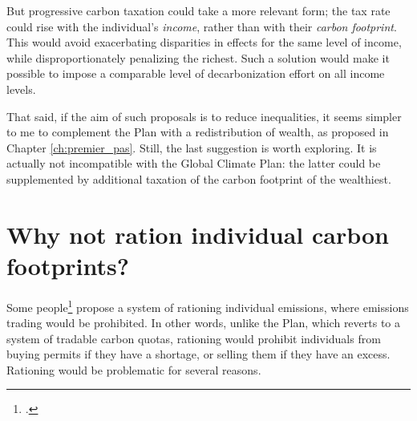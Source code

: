 \documentclass[a5paper,english,openany]{memoir}
\begin{document}
But progressive carbon taxation could take a more relevant form; %
the tax rate could rise with the individual's \textit{income}, rather than with their  %
\textit{carbon footprint}. This would avoid exacerbating disparities in effects for the same level of income, while disproportionately penalizing the richest. Such a solution would make it possible to impose a comparable level of decarbonization effort on all income levels. 


That said, if the aim of such proposals is to reduce inequalities, it seems simpler to me to complement the Plan with a redistribution of wealth, as proposed in Chapter \ref{ch:premier_pas}. Still, the last suggestion is worth exploring. It is actually not incompatible with the Global Climate Plan: the latter could be supplemented by additional taxation of the carbon footprint of the wealthiest. 

\section*{\normalsize Why not ration individual carbon footprints?}\label{q:rationing}

Some people\footnote{\citet{wood_rationing_2023}.} propose a system of rationing individual emissions, where emissions trading would be prohibited. In other words, unlike the %
Plan, which reverts to a system of tradable carbon quotas, rationing would prohibit individuals from buying permits if they have a shortage, or selling them if they have an excess. %
Rationing would be problematic for several reasons. 
\end{document}
